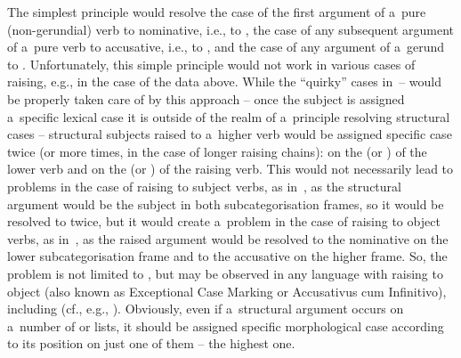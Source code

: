 \documentclass[output=paper]{langsci/langscibook}
\begin{document}
The simplest principle would resolve the case of the first  argument of a~pure (non-gerundial) verb to nominative, i.e., to , the case of any subsequent  argument of a~pure verb to accusative, i.e., to , and the case of any  argument of a~gerund to .  Unfortunately, this simple principle would not work in various cases of raising, e.g., in the case of the  data above.  While the “quirky” cases in~– would be properly taken care of by this approach – once the subject is assigned a~specific lexical case it is outside of the realm of a~principle resolving structural cases – structural subjects raised to a~higher verb would be assigned specific case twice (or more times, in the case of longer raising chains): on the  (or ) of the lower verb and on the  (or ) of the raising verb.  This would not necessarily lead to problems in the case of raising to subject verbs, as in~, as the structural argument would be the subject in both subcategorisation frames, so it would be resolved to  twice, but it would create a~problem in the case of raising to object verbs, as in~, as the raised argument would be resolved to the nominative on the lower subcategorisation frame and to the accusative on the higher frame.  So, the problem is not limited to , but may be observed in any language with raising to object (also known as Exceptional Case Marking or Accusativus cum Infinitivo), including  (cf., e.g., \citealt[231]{HM94a}).  Obviously, even if a~structural argument occurs on a~number of  or  lists, it should be assigned specific morphological case according to its position on just one of them – the highest one.
\end{document}
